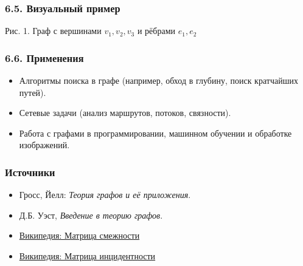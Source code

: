 \subsubsection{6.5. Визуальный пример}

\begin{center}

\vspace{0.5em}
\small Рис. 1. Граф с вершинами $v_1, v_2, v_3$ и рёбрами $e_1, e_2$
\end{center}

\subsubsection{6.6. Применения}

\begin{itemize}[leftmargin=*]
  \item Алгоритмы поиска в графе (например, обход в глубину, поиск кратчайших путей).
  \item Сетевые задачи (анализ маршрутов, потоков, связности).
  \item Работа с графами в программировании, машинном обучении и обработке изображений.
\end{itemize}

\subsubsection{Источники}

\begin{itemize}
  \item Гросс, Йелл: \emph{Теория графов и её приложения}.
  \item Д.Б. Уэст, \emph{Введение в теорию графов}.
  \item \href{https://ru.wikipedia.org/wiki/Матрица_смежности}{Википедия: Матрица смежности}
  \item \href{https://ru.wikipedia.org/wiki/Матрица_инцидентности}{Википедия: Матрица инцидентности}
\end{itemize}